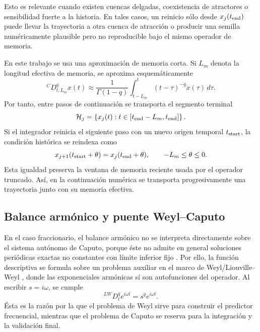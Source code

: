 \documentclass[journal]{IEEEtran}
\begin{document}
Esto es relevante cuando existen cuencas delgadas, coexistencia de atractores o sensibilidad fuerte a la historia. En tales casos, un reinicio sólo desde \(x_j(t_{\rm end})\) puede llevar la trayectoria a otra cuenca de atracción o producir una semilla numéricamente plausible pero no reproducible bajo el mismo operador de memoria\cite{LeonovKuznetsov2013,KuznetsovEtAl2017,Danca2017,GuanXie2025}.

En este trabajo se usa una aproximación de memoria corta. Si \(L_m\) denota la longitud efectiva de memoria, se aproxima esquemáticamente
\[
{}^CD_{t,L_m}^{q}x(t)
\approx
\frac{1}{\Gamma(1-q)}
\int_{t-L_m}^{t}(t-\tau)^{-q}\dot x(\tau)\,d\tau .
\]
Por tanto, entre pasos de continuación se transporta el segmento terminal
\[
\mathcal H_j=
\left\{x_j(t):t\in[t_{\rm end}-L_m,t_{\rm end}]\right\}.
\]
Si el integrador reinicia el siguiente paso con un nuevo origen temporal \(t_{\rm start}\), la condición histórica se reindexa como
\[
x_{j+1}(t_{\rm start}+\theta)
=
x_j(t_{\rm end}+\theta),
\qquad -L_m\leq\theta\leq 0.
\]
Esta igualdad preserva la ventana de memoria reciente usada por el operador truncado. Así, en la continuación numérica se transporta progresivamente  una trayectoria junto con su memoria efectiva.

\subsection{Balance armónico y puente Weyl--Caputo}

En el caso fraccionario, el balance armónico no se interpreta directamente sobre el sistema autónomo de Caputo, porque éste no admite en general soluciones periódicas exactas no constantes con límite inferior fijo \cite{TavazoeiHaeri2009,AreaLosadaNieto2014}. Por ello, la función descriptiva se formula sobre un problema auxiliar en el marco de Weyl/Liouville--Weyl \cite{Vigue2019}, donde las exponenciales armónicas sí son autofunciones del operador. Al escribir \(s=i\omega\), se cumple 
\[
{}^{LW}D_t^q e^{i\omega t}=s^q e^{i\omega t}.
\]
Ésta es la razón por la que el problema de Weyl sirve para construir el predictor frecuencial, mientras que el problema de Caputo se reserva para la integración y la validación final.
\end{document}
